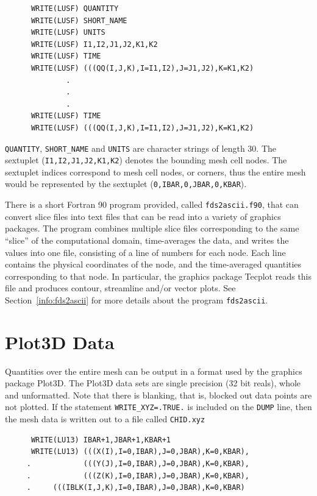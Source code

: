 \documentclass[11pt]{book}
\newcommand{\ct}{\tt\small}
\begin{document}
\footnotesize
\begin{verbatim}
      WRITE(LUSF) QUANTITY
      WRITE(LUSF) SHORT_NAME
      WRITE(LUSF) UNITS
      WRITE(LUSF) I1,I2,J1,J2,K1,K2
      WRITE(LUSF) TIME
      WRITE(LUSF) (((QQ(I,J,K),I=I1,I2),J=J1,J2),K=K1,K2)
              .
              .
              .
      WRITE(LUSF) TIME
      WRITE(LUSF) (((QQ(I,J,K),I=I1,I2),J=J1,J2),K=K1,K2)
\end{verbatim}
\normalsize
{\ct QUANTITY}, {\ct SHORT\_NAME} and {\ct UNITS} are
character strings of length 30.
The sextuplet ({\ct I1,I2,J1,J2,K1,K2}) denotes the bounding mesh cell
nodes. The sextuplet indices correspond to mesh cell
nodes, or corners, thus the entire mesh would be represented by the
sextuplet ({\ct 0,IBAR,0,JBAR,0,KBAR}).

There is a short Fortran 90 program provided, called
{\ct fds2ascii.f90},
that can convert slice files into text files that can be read
into a variety of graphics packages. The program combines multiple
slice files corresponding to the same ``slice'' of the computational
domain, time-averages the data, and writes the values into one file,
consisting of a line of numbers for each node. Each line contains the
physical coordinates of the node, and the time-averaged quantities
corresponding to that node. In particular, the graphics package
Tecplot
reads this file and produces contour, streamline and/or vector plots.
See Section~\ref{info:fds2ascii} for more details about the program
{\ct fds2ascii}.

\section{Plot3D Data}
\label{out:PL3D}

Quantities over the entire mesh can be output in a format used by the graphics package Plot3D.
The Plot3D data sets are single precision (32 bit reals), whole and
unformatted. Note that there is blanking, that is,
blocked out data points are not plotted.
If the statement {\ct WRITE\_XYZ=.TRUE.} is included on the {\ct DUMP}
line, then the mesh data is written out to a file called {\ct CHID.xyz}

\footnotesize
\begin{verbatim}
      WRITE(LU13) IBAR+1,JBAR+1,KBAR+1
      WRITE(LU13) (((X(I),I=0,IBAR),J=0,JBAR),K=0,KBAR),
     .            (((Y(J),I=0,IBAR),J=0,JBAR),K=0,KBAR),
     .            (((Z(K),I=0,IBAR),J=0,JBAR),K=0,KBAR),
     .     (((IBLK(I,J,K),I=0,IBAR),J=0,JBAR),K=0,KBAR)
\end{verbatim}
\normalsize
\end{document}
